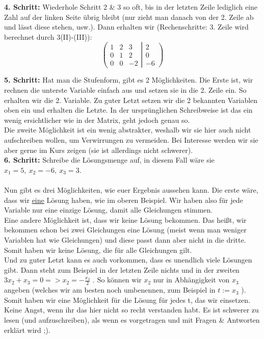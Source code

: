 	\textbf{4. Schritt:} Wiederhole Schritt 2 \& 3 so oft, bis in der letzten Zeile
	lediglich eine Zahl auf der linken Seite übrig bleibt (nur zieht man danach von
	der 2. Zeile ab und lässt diese stehen, usw.). Dann erhalten wir
	(Rechenschritte: 3. Zeile wird berechnet durch 3(II)-(III)):
	\[
	\left(
	 \begin{matrix}
	  1 & 2 & 3\\
	  0 & 1 & 2\\
	  0 & 0 & -2
	 \end{matrix}
	 \left|
	  \begin{matrix}
	   2\\
	   0\\
	   -6
	  \end{matrix}
	 \right)
	\right.
	\]

	\textbf{5. Schritt:} Hat man die Stufenform, gibt es 2 Möglichkeiten. Die Erste
	ist, wir rechnen die unterste Variable einfach aus und setzen sie in die 2.
	Zeile ein. So erhalten wir die 2. Variable. Zu guter Letzt setzen wir die 2
	bekannten Variablen oben ein und erhalten die Letzte. In der ursprünglichen
	Schreibweise ist das ein wenig ersichtlicher wie in der Matrix, geht jedoch
	genau so.\\
	Die zweite Möglichkeit ist ein wenig abstrakter, weshalb wir sie hier auch
	nicht aufschreiben wollen, um Verwirrungen zu vermeiden. Bei Interesse werden
	wir sie aber gerne im Kurs zeigen (sie ist allerdings nicht schwerer).\\

	\textbf{6. Schritt:} Schreibe die Lösungsmenge auf, in diesem Fall wäre sie
	\(x_1 = 5,\ x_2 =-6,\ x_3 = 3\). \\ \\
	Nun gibt es drei Möglichkeiten, wie euer Ergebnis aussehen kann. Die erste
	wäre, dass wir \underline{eine} Lösung haben, wie im oberen Beispiel. Wir haben
	also für jede Variable nur eine einzige Lösung, damit alle Gleichungen
	stimmen.\\
	Eine andere Möglichkeit ist, dass wir keine Lösung bekommen. Das heißt, wir
	bekommen schon bei zwei Gleichungen eine Lösung (meist wenn man weniger
	Variablen hat wie Gleichungen) und diese passt dann aber nicht in die dritte.
	Somit haben wir keine Lösung, die für alle Gleichungen gilt.\\
	Und zu guter Letzt kann es auch vorkommen, dass es unendlich viele Lösungen
	gibt. Dann steht zum Beispiel in der letzten Zeile nichts und in der zweiten
	\(3x_2 + x_3 = 0 => x_2 = - \frac{x_3}{2}\) . So können wir \(x_2\) nur in
	Abhängigkeit von \(x_3\) angeben (welches wir am besten noch umbenennen, zum
	Beispiel in \(t := x_3\) ). Somit haben wir eine Möglichkeit für die Lösung für
	jedes t, das wir einsetzen.\\
	Keine Angst, wenn ihr das hier nicht so recht verstanden habt. Es ist schwerer
	zu lesen (und aufzuschreiben), als wenn es vorgetragen und mit Fragen \&
	Antworten erklärt wird ;).
